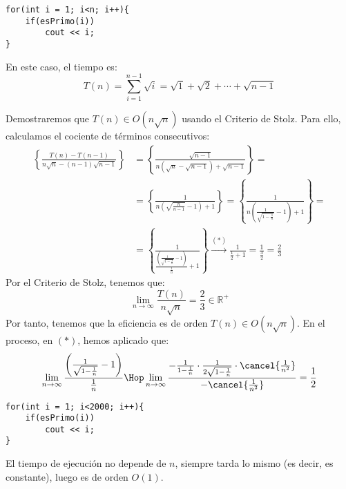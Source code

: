 \begin{ejemplo}
\begin{listing}[H]
\begin{verbatim}
for(int i = 1; i<n; i++){
    if(esPrimo(i))
        cout << i;
}
\end{verbatim}
\end{listing}
En este caso, el tiempo es: 
\begin{equation*}
T(n)=\sum_{i=1}^{n-1} \sqrt{i} = \sqrt{1} + \sqrt{2} + \cdots + \sqrt{n-1}
\end{equation*}

Demostraremos que $T(n)\in O(n\sqrt{n})$ usando el Criterio de Stolz. Para ello, calculamos el cociente de términos consecutivos:
\begin{align*}
    \left\{\frac{T(n)-T(n-1)}{n\sqrt{n} - (n-1)\sqrt{n-1}}\right\}
    &= \left\{\frac{\sqrt{n-1}}{n\left(\sqrt{n} - \sqrt{n-1}\right)+\sqrt{n-1}}\right\}
    =\\&= \left\{\frac{1}{n\left(\sqrt{\frac{n}{n-1}} - 1\right)+1}\right\}
    = \left\{\frac{1}{n\left(\frac{1}{\sqrt{1-\frac{1}{n}}} - 1\right)+1}\right\}
    =\\&= \left\{\frac{1}{\frac{\left(\frac{1}{\sqrt{1-\frac{1}{n}}} - 1\right)}{\frac{1}{n}}+1}\right\} \stackrel{(\ast)}{\to} \frac{1}{\frac{1}{2}+1}
    = \frac{1}{\frac{3}{2}} = \frac{2}{3}
\end{align*}
Por el Criterio de Stolz, tenemos que:
\begin{equation*}
\lim_{n\to\infty} \frac{T(n)}{n\sqrt{n}} = \frac{2}{3} \in \mathbb{R}^{+}
\end{equation*}
Por tanto, tenemos que la eficiencia es de orden $T(n)\in O(n\sqrt{n})$. En el proceso, en $(\ast)$, hemos aplicado que:
\begin{equation*}
\lim_{n\to\infty} \frac{\left(\frac{1}{\sqrt{1-\frac{1}{n}}} - 1\right)}{\frac{1}{n}}
\Hop \lim_{n\to\infty} \frac{-\frac{1}{1-\frac{1}{n}}\cdot \frac{1}{2\sqrt{1-\frac{1}{n}}}\cdot \cancel{\frac{1}{n^2}}}{-\cancel{\frac{1}{n^2}}} = \frac{1}{2}
\end{equation*}
\end{ejemplo}

\begin{ejemplo}
\begin{listing}[H]
\begin{verbatim}
for(int i = 1; i<2000; i++){
    if(esPrimo(i))
        cout << i;
}
\end{verbatim}
\end{listing}
El tiempo de ejecución no depende de $n$, siempre tarda lo mismo (es decir, es constante), luego es de orden $O(1)$.
\end{ejemplo}

